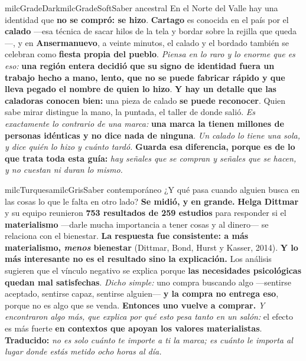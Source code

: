 \documentclass[11pt,letterpaper]{article}
\begin{document}
\begin{softbox}{milcGradeDark}{milcGradeSoft}{Saber ancestral}
En el Norte del Valle hay una identidad que \textbf{no se compró: se hizo}. \textbf{Cartago} es conocida en el país por el \textbf{calado} ---esa técnica de sacar hilos de la tela y bordar sobre la rejilla que queda---, y en \textbf{Ansermanuevo}, a veinte minutos, el calado y el bordado también se celebran como \textbf{fiesta propia del pueblo}. \emph{Piensa en lo raro y lo enorme que es eso:} \textbf{una región entera decidió que su signo de identidad fuera un trabajo hecho a mano, lento, que no se puede fabricar rápido y que lleva pegado el nombre de quien lo hizo}. \textbf{Y hay un detalle que las caladoras conocen bien:} una pieza de calado \textbf{se puede reconocer}. Quien sabe mirar distingue la mano, la puntada, el taller de donde salió. \emph{Es exactamente lo contrario de una marca:} \textbf{una marca la tienen millones de personas idénticas y no dice nada de ninguna}. \emph{Un calado lo tiene una sola, y dice quién lo hizo y cuánto tardó.} \textbf{Guarda esa diferencia, porque es de lo que trata toda esta guía:} \emph{hay señales que se compran y señales que se hacen, y no cuestan ni duran lo mismo.}
\end{softbox}

\begin{softbox}{milcTurquesa}{milcGris}{Saber contemporáneo}
¿Y qué pasa cuando alguien busca en las cosas lo que le falta en otro lado? \textbf{Se midió, y en grande.} \textbf{Helga Dittmar} y su equipo reunieron \textbf{753 resultados de 259 estudios} para responder si el \textbf{materialismo} ---darle mucha importancia a tener cosas y al dinero--- se relaciona con el bienestar. \textbf{La respuesta fue consistente: a más materialismo, \emph{menos} bienestar} (Dittmar, Bond, Hurst y Kasser, 2014). \textbf{Y lo más interesante no es el resultado sino la explicación.} Los análisis sugieren que el vínculo negativo se explica porque \textbf{las necesidades psicológicas quedan mal satisfechas}. \emph{Dicho simple:} uno compra buscando algo ---sentirse aceptado, sentirse capaz, sentirse alguien--- \textbf{y la compra no entrega eso}, porque no es algo que se venda. \textbf{Entonces uno vuelve a comprar.} \emph{Y encontraron algo más, que explica por qué esto pesa tanto en un salón:} el efecto es más fuerte \textbf{en contextos que apoyan los valores materialistas}. \textbf{Traducido:} \emph{no es solo cuánto te importe a ti la marca; es cuánto le importa al lugar donde estás metido ocho horas al día.}
\end{softbox}
\end{document}
